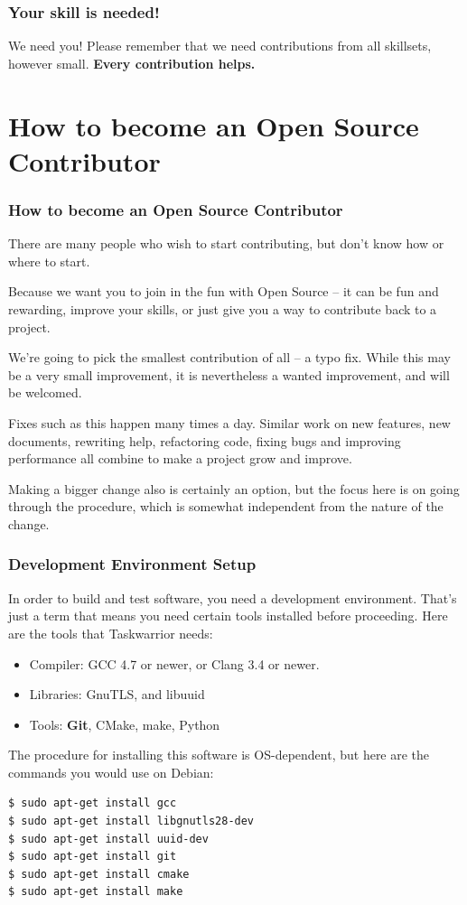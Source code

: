\documentclass[t,handout]{beamer}
\begin{document}
\begin{frame}[fragile]\frametitle{Your skill is needed!}
    \vfill
    \begin{alertblock}{We need you!}
        Please remember that we need contributions from all skillsets, however small. \textbf{Every contribution helps.}
    \end{alertblock}
    \vfill
\end{frame}

\section{How to become an Open Source Contributor}

\begin{frame}[fragile]\frametitle{How to become an Open Source Contributor}
    There are many people who wish to start contributing, but don't know how or where to start.

    Because we want you to join in the fun with Open Source -- it can be fun and rewarding, improve your skills, or just give you a way to contribute back to a project.

    We're going to pick the smallest contribution of all -- a typo fix. While this may be a very small improvement, it is nevertheless a wanted improvement, and will be welcomed.

    Fixes such as this happen many times a day. Similar work on new features, new documents, rewriting help, refactoring code, fixing bugs and improving performance all combine to make a project grow and improve.

    Making a bigger change also is certainly an option, but the focus here is on going through the procedure, which is somewhat independent from the nature of the change.
\end{frame}

\begin{frame}[fragile]\frametitle{Development Environment Setup}
    In order to build and test software, you need a development environment. That's just a term that means you need certain tools installed before proceeding. Here are the tools that Taskwarrior needs:

    \begin{itemize}
    \item Compiler: GCC 4.7 or newer, or Clang 3.4 or newer.
    \item Libraries: GnuTLS, and libuuid
    \item Tools: \textbf{Git}, CMake, make, Python
    \end{itemize}

    The procedure for installing this software is OS-dependent, but here are the commands you would use on Debian:

    \begin{lstlisting}
$ sudo apt-get install gcc
$ sudo apt-get install libgnutls28-dev
$ sudo apt-get install uuid-dev
$ sudo apt-get install git
$ sudo apt-get install cmake
$ sudo apt-get install make\end{lstlisting}
\end{frame}
\end{document}
